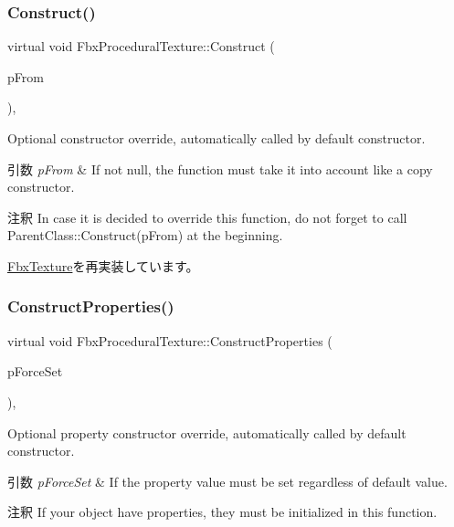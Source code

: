 \subsubsection{\texorpdfstring{Construct()}{Construct()}}
{\footnotesize\ttfamily virtual void Fbx\+Procedural\+Texture\+::\+Construct (\begin{DoxyParamCaption}\item[{const \hyperlink{class_fbx_object}{Fbx\+Object} $\ast$}]{p\+From }\end{DoxyParamCaption})\hspace{0.3cm}{\ttfamily [protected]}, {\ttfamily [virtual]}}

Optional constructor override, automatically called by default constructor. 
\begin{DoxyParams}{引数}
{\em p\+From} & If not null, the function must take it into account like a copy constructor. \\
\hline
\end{DoxyParams}
\begin{DoxyRemark}{注釈}
In case it is decided to override this function, do not forget to call Parent\+Class\+::\+Construct(p\+From) at the beginning. 
\end{DoxyRemark}


\hyperlink{class_fbx_texture_afc81141345bc807a77dcbd9d6a0d8356}{Fbx\+Texture}を再実装しています。

\mbox{\label{class_fbx_procedural_texture_ae718dfc2092f735a1b6bcd724029a36c}} 
\subsubsection{\texorpdfstring{Construct\+Properties()}{ConstructProperties()}}
{\footnotesize\ttfamily virtual void Fbx\+Procedural\+Texture\+::\+Construct\+Properties (\begin{DoxyParamCaption}\item[{bool}]{p\+Force\+Set }\end{DoxyParamCaption})\hspace{0.3cm}{\ttfamily [protected]}, {\ttfamily [virtual]}}

Optional property constructor override, automatically called by default constructor. 
\begin{DoxyParams}{引数}
{\em p\+Force\+Set} & If the property value must be set regardless of default value. \\
\hline
\end{DoxyParams}
\begin{DoxyRemark}{注釈}
If your object have properties, they must be initialized in this function. 
\end{DoxyRemark}


